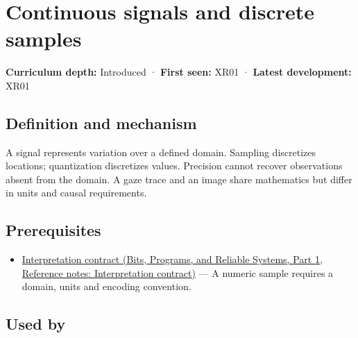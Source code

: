 \hypertarget{appendix-1077ea8fc737}{}\label{referencestart:appendix-1077ea8fc737}
\section{Continuous signals and discrete samples}\label{appendix-1077ea8fc737-continuous-signals-and-discrete-samples}

\hypertarget{appendix-1077ea8fc737-continuous-signals-and-discrete-samples}{}

\textbf{Curriculum depth:} Introduced · \textbf{First seen:} XR01 · \textbf{Latest development:} XR01

\begin{allmightroledefinition}

\subsection{Definition and mechanism}\label{appendix-1077ea8fc737-definition-and-mechanism}

\hypertarget{appendix-1077ea8fc737-definition-and-mechanism}{}

A signal represents variation over a defined domain. Sampling discretizes locations; quantization discretizes values. Precision cannot recover observations absent from the domain. A gaze trace and an image share mathematics but differ in units and causal requirements.

\end{allmightroledefinition}

\subsection{Prerequisites}\label{appendix-1077ea8fc737-prerequisites}

\hypertarget{appendix-1077ea8fc737-prerequisites}{}

\begin{itemize}
\tightlist
\item
  \href{../01-Bits-Programs-and-Reliable-Systems-P01/main.pdf\#nameddest=appendix-f414bd4ed05c}{Interpretation contract (Bits, Programs, and Reliable Systems, Part 1, Reference notes: Interpretation contract)} --- A numeric sample requires a domain, units and encoding convention.
\end{itemize}

\subsection{Used by}\label{appendix-1077ea8fc737-used-by}

